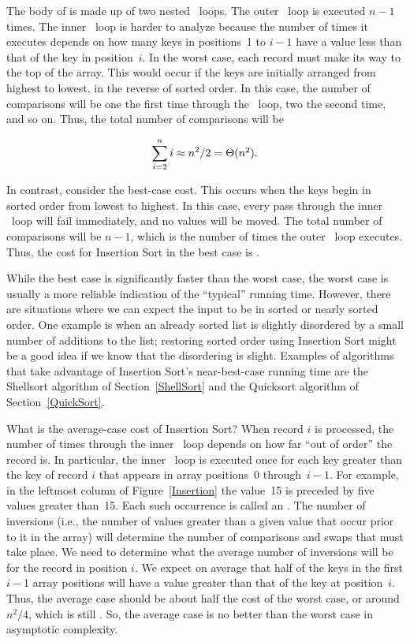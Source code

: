 The body of  is made up of two nested \Cfor\ loops.
The outer \Cfor\ loop is executed \(n-1\) times.
The inner \Cfor\ loop is harder to analyze because the
number of times it executes depends on how many keys in positions~1 to
\(i-1\) have a value less than that of the key in position~\(i\).
In the worst case, each record must make its way to the top of the
array.
This would occur if the keys are initially arranged from highest to
lowest, in the reverse of sorted order.
In this case, the number of comparisons will be one the first time
through the \Cfor\ loop, two the second time, and so on.
Thus, the total number of comparisons will be

\[ \sum_{i=2}^n i \approx n^2/2 = \mbox{$\Theta(n^2)$}. \]

\vspace{-\medskipamount}
In contrast, consider the best-case cost.
This occurs when the keys begin in sorted order from lowest to
highest.
In this case, every pass through the inner \Cfor\ loop will fail
immediately, and no values will be moved.
The total number of comparisons will be \(n-1\), which is the
number of times the outer \Cfor\ loop executes.
Thus, the cost for Insertion Sort in the best case is \Thetan.

While the best case is significantly faster than the worst case,
the worst case is usually a more reliable indication of the ``typical''
running time.
However, there are situations where we can expect the input to be in
sorted or nearly sorted order.
One example is when an already sorted list is slightly disordered by a
small number of additions to the list;
restoring sorted order using Insertion Sort might be a good idea if we
know that the disordering is slight.
Examples of algorithms that take advantage of Insertion Sort's
near-best-case running time are the Shellsort algorithm
of Section~\ref{ShellSort} and
the Quicksort algorithm of
Section~\ref{QuickSort}.

What is the average-case cost of Insertion Sort?
When record \(i\) is processed, the number
of times through the inner \Cfor\ loop depends on how far ``out of
order'' the record is.
In particular, the inner \Cfor\ loop is executed once for each key
greater than the key of record \(i\) that appears in array positions~0
through~\(i-1\).
For example, in the leftmost column of Figure~\ref{Insertion} the
value~15 is preceded by five values greater than~15.
Each such occurrence is called an .
The number of inversions (i.e., the number of values greater than a
given value that occur prior to it in the array) will determine the
number of comparisons and swaps that must take place.
We need to determine what the average number of inversions will
be for the record in position \(i\).
We expect on average that half of the keys in the first \(i-1\) array
positions will have a value greater than that of the key at
position~\(i\).
Thus, the average case should be about half the cost of the worst
case, or around \(n^2/4\), which is still \Thetantwo.
So, the average case is no better than the worst case in
asymptotic complexity.

